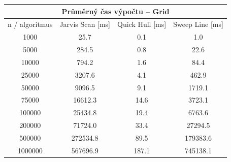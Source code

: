 \documentclass[a4paper, 12pt]{article}
\begin{document}
\begin{table}[]
\centering
\begin{tabular}{|c|c|c|c|}
\hline
\multicolumn{4}{|c|}{\textbf{Průměrný čas výpočtu – Grid}}                        \\ \hline
n / algoritmus & Jarvis Scan {[}ms{]} & Quick Hull {[}ms{]} & Sweep Line {[}ms{]} \\ \hline
1000           & 25.7                 & 0.1                 & 1.0                 \\ \hline
5000           & 284.5                & 0.8                 & 22.6                \\ \hline
10000          & 794.2                & 1.6                 & 84.4                \\ \hline
25000          & 3207.6               & 4.1                 & 462.9               \\ \hline
50000          & 9096.5               & 9.1                 & 1719.1              \\ \hline
75000          & 16612.3              & 14.6                & 3723.1              \\ \hline
100000         & 25434.8              & 19.4                & 6763.6              \\ \hline
200000         & 71724.0              & 33.4                & 27294.5             \\ \hline
500000         & 272534.8             & 89.5                & 179383.6            \\ \hline
1000000        & 567696.9             & 187.1               & 745138.1            \\ \hline
\end{tabular}
\end{table}
\end{document}

